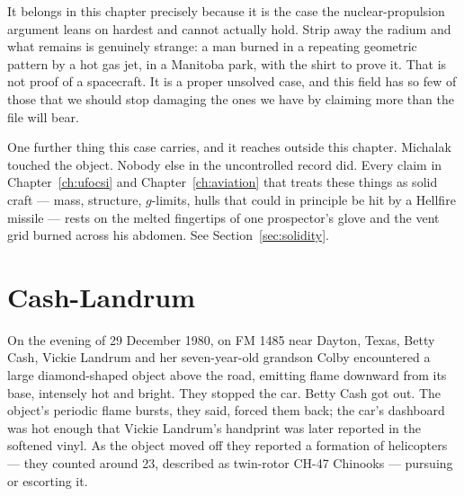  It belongs in this chapter precisely because it is the
case the nuclear-propulsion argument leans on hardest and cannot actually hold. Strip away the
radium and what remains is genuinely strange: a man burned in a repeating geometric pattern by a
hot gas jet, in a Manitoba park, with the shirt to prove it. That is not proof of a spacecraft. It
is a proper unsolved case, and this field has so few of those that we should stop damaging the
ones we have by claiming more than the file will bear.

One further thing this case carries, and it reaches outside this chapter. Michalak touched the
object. Nobody else in the uncontrolled record did. Every claim in
Chapter~\ref{ch:ufocsi} and Chapter~\ref{ch:aviation} that treats these things as solid craft ---
mass, structure, $g$-limits, hulls that could in principle be hit by a Hellfire missile --- rests
on the melted fingertips of one prospector's glove and the vent grid burned across his abdomen.
See Section~\ref{sec:solidity}. 

\Needspace*{0.40\textheight}
\section{Cash-Landrum}\label{sec:cashlandrum}

On the evening of 29 December 1980, on FM 1485 near Dayton, Texas, Betty Cash, Vickie Landrum and
her seven-year-old grandson Colby encountered a large diamond-shaped object above the road, emitting
flame downward from its base, intensely hot and bright. They stopped the car. Betty Cash got out.
The object's periodic flame bursts, they said, forced them back; the car's dashboard was hot
enough that Vickie Landrum's handprint was later reported in the softened vinyl. As the object
moved off they reported a formation of helicopters --- they counted around 23, described as
twin-rotor CH-47 Chinooks --- pursuing or escorting it.


